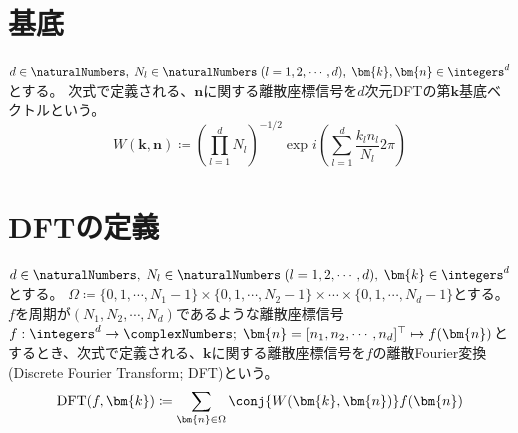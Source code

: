 			\section{基底}
				$d\in\naturalNumbers,\;N_l\in\naturalNumbers\;(l=1,2,\cdots,d),\;\bm{k},\bm{n}\in\integers^d$とする。
				次式で定義される、$\bm{n}$に関する離散座標信号を$d$次元DFTの第$\bm{k}$基底ベクトルという。
				\[ W(\bm{k},\bm{n}) \coloneqq \left(\prod_{l=1}^d N_l\right)^{-1/2} \exp i\left(\sum_{l=1}^d \frac{k_l n_l}{N_l}2\pi\right)\]

			\section{DFTの定義}
				\label{DFTの定義}
				$d\in\naturalNumbers,\;N_l\in\naturalNumbers\;(l=1,2,\cdots,d),\;\bm{k}\in\integers^d$とする。
				$\Omega \coloneqq \{0,1,\cdots,N_1-1\}\times\{0,1,\cdots,N_2-1\}\times\cdots\times\{0,1,\cdots,N_d-1\}$とする。
				$f$を周期が$(N_1,N_2,\cdots,N_d)$であるような離散座標信号$f: \integers^d\to\complexNumbers;\;\bm{n} = [n_1,n_2,\cdots,n_d]^\top \mapsto f(\bm{n})$とするとき、次式で定義される、$\bm{k}$に関する離散座標信号を$f$の離散Fourier変換(Discrete Fourier Transform; DFT)という。
				\[ \text{DFT}(f,\bm{k}) \coloneqq \sum_{\bm{n}\in\Omega} \conj{W(\bm{k},\bm{n})} f(\bm{n}) \]

